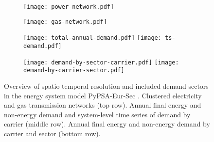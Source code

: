 \documentclass[12pt,3p]{elsarticle}
\begin{document}
\renewcommand{\ttdefault}{\sfdefault}

% 


\begin{figure}[ht!]
    \centering
\begin{subfigure}[t]{0.49\textwidth}
    \centering
    \texttt{[image: power-network.pdf]}
\end{subfigure}
\begin{subfigure}[t]{0.49\textwidth}
    \centering
    \texttt{[image: gas-network.pdf]}
\end{subfigure}
\begin{subfigure}{\textwidth}
	\centering
    \texttt{[image: total-annual-demand.pdf]}
    \texttt{[image: ts-demand.pdf]}
\end{subfigure}
\begin{subfigure}{\textwidth}
    \centering
    \texttt{[image: demand-by-sector-carrier.pdf]}
    \texttt{[image: demand-by-carrier-sector.pdf]}
\end{subfigure}
\caption{Overview of spatio-temporal resolution and included demand sectors in the energy system model PyPSA-Eur-Sec \cite{PyPSAEurSecSectorCoupled}. Clustered electricity and gas transmission networks (top row). Annual final energy and non-energy demand and system-level time series of demand by carrier (middle row). Annual final energy and non-energy demand by carrier and sector (bottom row).}
\label{fig:teaser}
\end{figure}
\end{document}
